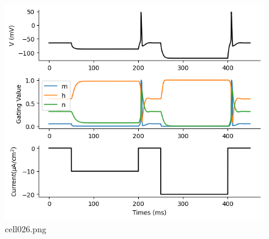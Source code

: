 \begin{figure}[ht]
	\centering
	\includegraphics[scale=0.8, max width=\linewidth]{./fig/neuron-model/hodgkin-huxley/cell026.png}
	\caption{cell026.png}
	\label{cell026.png}
\end{figure}